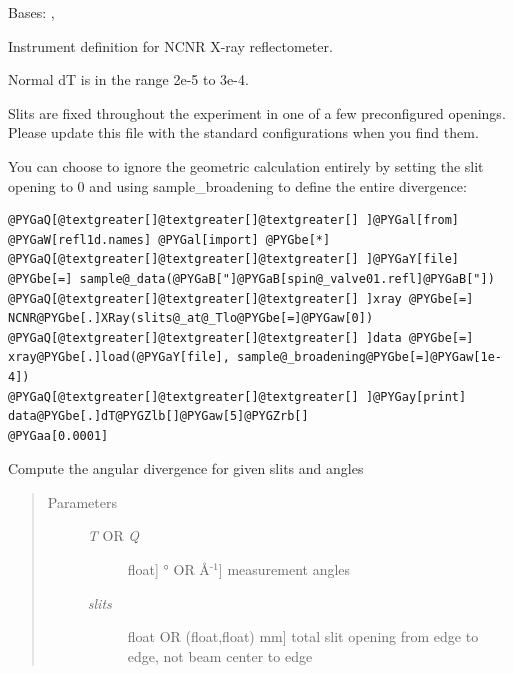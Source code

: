 \documentclass[letterpaper,10pt,english]{sphinxmanual}
\begin{document}
\begin{fulllineitems}
\label{api/ncnrdata:refl1d.ncnrdata.XRay}
Bases: {\hyperref[api/ncnrdata:refl1d.ncnrdata.NCNRData]{}}, {\hyperref[api/instrument:refl1d.instrument.Monochromatic]{}}

Instrument definition for NCNR X-ray reflectometer.

Normal dT is in the range 2e-5 to 3e-4.

Slits are fixed throughout the experiment in one of a
few preconfigured openings.  Please update this file with
the standard configurations when you find them.

You can choose to ignore the geometric calculation entirely
by setting the slit opening to 0 and using sample\_broadening
to define the entire divergence:

\begin{Verbatim}[commandchars=@\[\]]
@PYGaQ[@textgreater[]@textgreater[]@textgreater[] ]@PYGal[from] @PYGaW[refl1d.names] @PYGal[import] @PYGbe[*]
@PYGaQ[@textgreater[]@textgreater[]@textgreater[] ]@PYGaY[file] @PYGbe[=] sample@_data(@PYGaB["]@PYGaB[spin@_valve01.refl]@PYGaB["])
@PYGaQ[@textgreater[]@textgreater[]@textgreater[] ]xray @PYGbe[=] NCNR@PYGbe[.]XRay(slits@_at@_Tlo@PYGbe[=]@PYGaw[0])
@PYGaQ[@textgreater[]@textgreater[]@textgreater[] ]data @PYGbe[=] xray@PYGbe[.]load(@PYGaY[file], sample@_broadening@PYGbe[=]@PYGaw[1e-4])
@PYGaQ[@textgreater[]@textgreater[]@textgreater[] ]@PYGay[print] data@PYGbe[.]dT@PYGZlb[]@PYGaw[5]@PYGZrb[]
@PYGaa[0.0001]
\end{Verbatim}

\begin{fulllineitems}
\label{api/ncnrdata:refl1d.ncnrdata.XRay.calc_dT}
Compute the angular divergence for given slits and angles
\begin{quote}\begin{description}
\item[{Parameters }] \leavevmode\begin{description}
\item[{\emph{T} OR \emph{Q}}] \leavevmode{[}{[}float{]} \textbar{} ° OR Å$^{\text{-1}}${]}
measurement angles

\item[{\emph{slits}}] \leavevmode{[}float OR (float,float) \textbar{} mm{]}
total slit opening from edge to edge, not beam center to edge


\end{description}
\end{description}
\end{quote}
\end{fulllineitems}
\end{fulllineitems}
\end{document}
